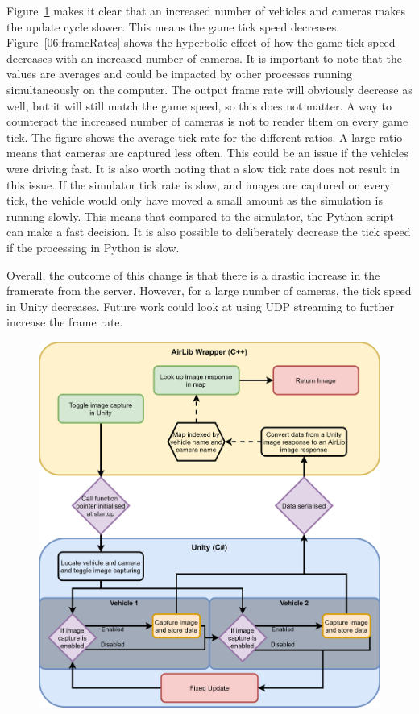 Figure~\ref{06:imageCaptureUpdated} makes it clear that an increased number of vehicles and cameras makes the update cycle slower. This means the game tick speed decreases. Figure~\ref{06:frameRates} shows the hyperbolic effect of how the game tick speed decreases with an increased number of cameras. It is important to note that the values are averages and could be impacted by other processes running simultaneously on the computer. The output frame rate will obviously decrease as well, but it will still match the game speed, so this does not matter. A way to counteract the increased number of cameras is not to render them on every game tick. The figure shows the average tick rate for the different ratios. A large ratio means that cameras are captured less often. This could be an issue if the vehicles were driving fast. It is also worth noting that a slow tick rate does not result in this issue. If the simulator tick rate is slow, and images are captured on every tick, the vehicle would only have moved a small amount as the simulation is running slowly. This means that compared to the simulator, the Python script can make a fast decision. It is also possible to deliberately decrease the tick speed if the processing in Python is slow. 

Overall, the outcome of this change is that there is a drastic increase in the framerate from the server. However, for a large number of cameras, the tick speed in Unity decreases. Future work could look at using UDP streaming to further increase the frame rate.  

\begin{figure}[p]
    \centering
    \includegraphics[width=1.0\textwidth]{06_Implementation/00_AirSim/Diagrams/imagecaptureUpdated.png}
    \caption{} \label{06:imageCaptureUpdated}
\end{figure}

